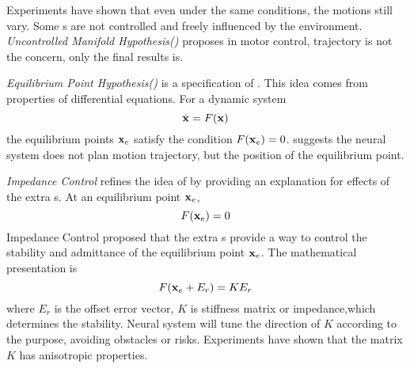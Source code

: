 Experiments have shown that even under the same conditions, the motions still vary. 
Some \dof s are not controlled and freely influenced by the environment. 
\emph{Uncontrolled Manifold Hypothesis(\umh)}\citep{latash2008neurophysiological} proposes in motor control, trajectory is not the concern, only the final results is.


\emph{Equilibrium Point Hypothesis(\eph)}\citep{feldman1986ome} is a specification of \umh.
This idea comes from properties of differential equations. 
For a dynamic system
\[
\dot{\mathbf{x}}=F(\mathbf{x})
\]
the equilibrium points $\mathbf{x}_{e}$ satisfy the condition $F(\mathbf{x}_{e})=0$.
\eph suggests the neural system does not plan motion trajectory, but the position of the equilibrium point.



\emph{Impedance Control} \citep{hogan1985ica} refines the idea of \eph by providing an explanation for effects of the extra \dof s. 
At an equilibrium point $\mathbf{x}_{e}$,
\[
F(\mathbf{x}_{e})=0 
\]
Impedance Control proposed that the extra \dof s provide a way to control the stability and admittance of the equilibrium point $\mathbf{x}_{e}$. 
The mathematical presentation is
\begin{equation}
F(\mathbf{x}_{e}+E_r)=KE_r
\end{equation}
where $E_r$ is the offset error vector, $K$ is stiffness matrix or impedance,which determines the stability.
Neural system will tune the direction of $K$ according to the purpose,  avoiding obstacles or risks. 
Experiments \citep{Franklin2007} have shown  that the matrix $K$ has anisotropic properties.







